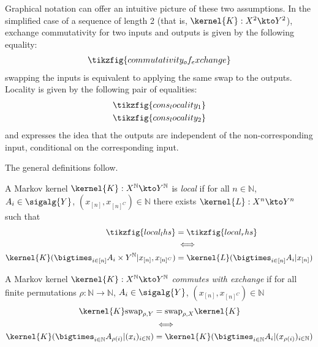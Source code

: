 Graphical notation can offer an intuitive picture of these two assumptions. In the simplified case of a sequence of length 2 (that is, $\kernel{K}:X^2\kto Y^2$), exchange commutativity for two inputs and outputs is given by the following equality:
\begin{align}
    \tikzfig{commutativity_of_exchange}
\end{align}
swapping the inputs is equivalent to applying the same swap to the outputs. Locality is given by the following pair of equalities:
\begin{align}
    \tikzfig{cons_locality_1}\\
    \tikzfig{cons_locality_2}
\end{align}
and expresses the idea that the outputs are independent of the non-corresponding input, conditional on the corresponding input.

The general definitions follow.

\begin{definition}[Locality]\label{def:caus_cont}
A Markov kernel $\kernel{K}:X^{\mathbb{N}}\kto Y^{\mathbb{N}}$ is \emph{local} if for all $n\in \mathbb{N}$, $A_i\in \sigalg{Y}$, $(x_{[n]},x_{[n]^C})\in\mathbb{N}$ there exists $\kernel{L}:X^n\kto Y^n$ such that
\begin{align}
    \tikzfig{local_lhs} &= \tikzfig{local_rhs}\\
    &\iff\\
    \kernel{K}(\bigtimes_{i\in [n]} A_i\times Y^{\mathbb{N}}|x_{[n]},x_{[n]^C}) &= \kernel{L}(\bigtimes_{i\in [n]} A_i|x_{[n]})
\end{align}
\end{definition}

\begin{definition}\label{def:caus_exch}
A Markov kernel $\kernel{K}:X^{\mathbb{N}}\kto Y^{\mathbb{N}}$ \emph{commutes with exchange} if for all finite permutations $\rho:\mathbb{N}\to\mathbb{N}$, $A_i\in \sigalg{Y}$, $(x_{[n]},x_{[n]^C})\in\mathbb{N}$
\begin{align}
    \kernel{K}\mathrm{swap}_{\rho,Y} &=  \mathrm{swap}_{\rho,X} \kernel{K}\\
    &\iff\\
    \kernel{K}(\bigtimes_{i\in\mathbb{N}} A_{\rho(i)}|(x_i)_{i\in {\mathbb{N}}}) &= \kernel{K}(\bigtimes_{i\in\mathbb{N}} A_{i}|(x_{\rho(i)})_{i\in {\mathbb{N}}})
\end{align}
\end{definition}

